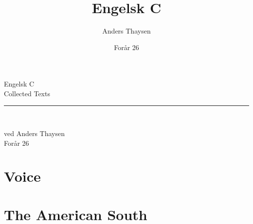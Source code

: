 \documentclass[10pt,a4paper]{book}
\title{Engelsk C}
\author{Anders Thaysen}
\date{Forår 26}
\begin{document}
\frontmatter

\begin{titlepage}
  \centering
  \vspace*{0.18\textheight}
  {\plantinb\fontsize{42}{46}\selectfont\color{hgblue}Engelsk C\\[0.4em]}
  {\plantin\Large\color{DarkSlateGray}Collected Texts\\}
  \vspace{1.5em}
  {\color{hggrey}\rule{0.45\textwidth}{0.8pt}\\}
  \vfill
  {\plantin\Large ved Anders Thaysen\\}
  {\plantin\large Forår 26}
\end{titlepage}

\tableofcontents

\mainmatter

\chapter{Voice}









\chapter{The American South}






\end{document}
